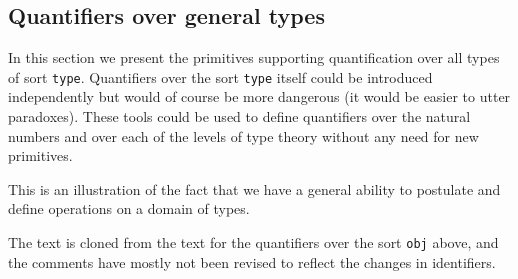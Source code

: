 \documentclass[12pt]{article}
\begin{document}
\subsection{Quantifiers over general types}

In this section we present the primitives supporting quantification over all types of sort {\tt type}.  Quantifiers over the sort {\tt type} itself could be introduced independently
but would of course be more dangerous (it would be easier to utter paradoxes).  These tools could be used to define quantifiers over the natural numbers and over each of the levels
of type theory without any need for new primitives.

This is an illustration of the fact that we have a general ability to postulate and define operations on a domain of types.

The text is cloned from the text for the quantifiers over the sort {\tt obj} above, and the comments have mostly not been revised to reflect the changes
in identifiers.
\end{document}
